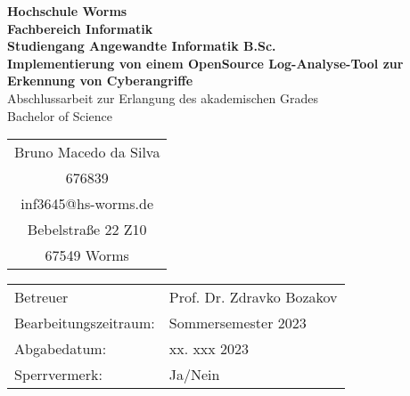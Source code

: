 \begin{titlepage}
    \vspace*{2mm}
    \begin{center}
        \Large
        \textbf{Hochschule Worms}\\
        \textbf{Fachbereich Informatik}\\
        \textbf{Studiengang Angewandte Informatik B.Sc.}\\
        \vspace{2.5cm}
        \textbf{Implementierung von einem OpenSource Log-Analyse-Tool zur Erkennung von Cyberangriffe}\\
        \vspace{1cm}
        \large
        Abschlussarbeit zur Erlangung des akademischen Grades \\
        Bachelor of Science
        \vspace{2cm}
        \begin {table}[ht]
        \centering
            \begin{tabular}{c}
                Bruno Macedo da Silva  \\ 
                676839                \\
                inf3645@hs-worms.de   \\
                Bebelstraße 22 Z10    \\
                67549 Worms            \\
            \end{tabular}
        \end {table}
        \vspace{1.5cm}
        \large
        \vspace{1cm}
        \begin{table}[h]
            \centering
            \begin{tabular}{l l}
                Betreuer                  & Prof. Dr. Zdravko Bozakov \\
                Bearbeitungszeitraum:     & Sommersemester 2023 \\
                Abgabedatum:              & xx. xxx 2023 \\
                Sperrvermerk:             & Ja/Nein \\
            \end{tabular}
        \end{table}    
    \end{center}
    \normalsize
    \vfill
\end{titlepage}